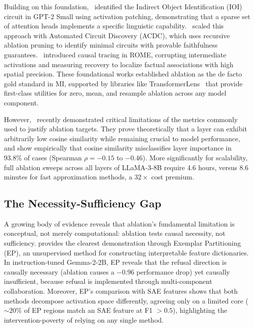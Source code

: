\documentclass[pdflatex,sn-mathphys-num]{sn-jnl}
\begin{document}
Building on this foundation,~\cite{Wang2022} identified the Indirect Object Identification (IOI) circuit in GPT-2 Small using activation patching, demonstrating that a sparse set of attention heads implements a specific linguistic capability.~\cite{Conmy2023} scaled this approach with Automated Circuit Discovery (ACDC), which uses recursive ablation pruning to identify minimal circuits with provable faithfulness guarantees.~\cite{Meng2022} introduced causal tracing in ROME, corrupting intermediate activations and measuring recovery to localize factual associations with high spatial precision. These foundational works established ablation as the de facto gold standard in MI, supported by libraries like TransformerLens~\cite{NandaBloom2022} that provide first-class utilities for zero, mean, and resample ablation across any model component.

However,~\cite{Hinostroza2026} recently demonstrated critical limitations of the metrics commonly used to justify ablation targets. They prove theoretically that a layer can exhibit arbitrarily low cosine similarity while remaining crucial to model performance, and show empirically that cosine similarity misclassifies layer importance in 93.8\% of cases (Spearman $\rho = -0.15$ to $-0.46$). More significantly for scalability, full ablation sweeps across all layers of LLaMA-3-8B require 4.6 hours, versus 8.6 minutes for fast approximation methods, a $32\times$ cost premium.

\subsection{The Necessity-Sufficiency Gap}

A growing body of evidence reveals that ablation's fundamental limitation is conceptual, not merely computational: ablation tests causal necessity, not sufficiency. \cite{Rumbelow2026} provides the clearest demonstration through Exemplar Partitioning (EP), an unsupervised method for constructing interpretable feature dictionaries. In instruction-tuned Gemma-2-2B, EP reveals that the refusal direction is causally necessary (ablation causes a $-0.96$ performance drop) yet causally insufficient, because refusal is implemented through multi-component collaboration. Moreover, EP's comparison with SAE features shows that both methods decompose activation space differently, agreeing only on a limited core ($\sim20\%$ of EP regions match an SAE feature at F1 $> 0.5$), highlighting the intervention-poverty of relying on any single method.
\end{document}
